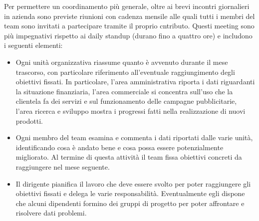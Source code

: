 				Per permettere un coordinamento più generale, oltre ai brevi incontri giornalieri in azienda sono previste riunioni
				con cadenza mensile alle quali tutti i membri del team sono invitati a partecipare tramite il proprio cntributo.
				Questi meeting sono più impegnativi rispetto ai daily standup (durano fino a quattro ore) e includono i seguenti
				elementi:
				\begin{itemize}
					\item Ogni unità organizzativa riassume quanto è avvenuto durante il mese trascorso, con particolare
					riferimento all'eventuale raggiungimento degli obiettivi fissati. In particolare, l'area amministrativa
					riporta i dati riguardanti la situazione finanziaria, l'area commerciale si concentra sull'uso che la
					clientela fa dei servizi e sul funzionamento delle campagne pubblicitarie, l'area ricerca e sviluppo mostra
					i progressi fatti nella realizzazione di nuovi prodotti.
					\item Ogni membro del team esamina e commenta i dati riportati dalle varie unità, identificando cosa è andato
					bene e cosa possa essere potenzialmente migliorato. Al termine di questa attività il team fissa obiettivi
					concreti da raggiungere nel mese seguente.
					\item Il dirigente pianifica il lavoro che deve essere svolto per poter raggiungere gli obiettivi fissati e
					delega le varie responsabilità. Eventualmente egli dispone che alcuni dipendenti formino dei gruppi di
					progetto per poter affrontare e risolvere dati problemi.
				\end{itemize}
